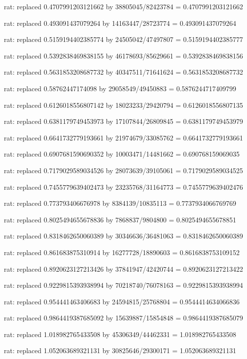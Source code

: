 \documentclass[a4paper,10pt]{article}
\begin{document}
\begin{eulernotebook}
\begin{eulercomment}
\begin{eulercomment}
\begin{eulercomment}
\begin{eulercomment}
\begin{eulercomment}
\begin{eulercomment}
\begin{eulercomment}
\begin{eulercomment}
\begin{eulercomment}
\begin{eulercomment}
\begin{eulercomment}
\begin{eulercomment}
\begin{eulercomment}
\begin{eulercomment}
\begin{eulercomment}
\begin{eulercomment}
\begin{euleroutput}
  rat: replaced 0.4707991203121662 by 38805045/82423784 = 0.4707991203121662
  
  rat: replaced 0.493091437079264 by 14163447/28723774 = 0.493091437079264
  
  rat: replaced 0.5159194402385774 by 24505042/47497807 = 0.5159194402385777
  
  rat: replaced 0.5392838469838155 by 46178693/85629661 = 0.5392838469838156
  
  rat: replaced 0.5631853208687732 by 40347511/71641624 = 0.5631853208687732
  
  rat: replaced 0.58762447174098 by 29058549/49450883 = 0.5876244717409799
  
  rat: replaced 0.6126018556807142 by 18023233/29420794 = 0.6126018556807135
  
  rat: replaced 0.6381179749453973 by 17107844/26809845 = 0.6381179749453979
  
  rat: replaced 0.6641732779193661 by 21974679/33085762 = 0.6641732779193661
  
  rat: replaced 0.6907681590690352 by 10003471/14481662 = 0.690768159069035
  
  rat: replaced 0.7179029589034526 by 28073639/39105061 = 0.7179029589034525
  
  rat: replaced 0.7455779639402473 by 23235768/31164773 = 0.7455779639402476
  
  rat: replaced 0.773793406676978 by 8384139/10835113 = 0.7737934066769769
  
  rat: replaced 0.8025494655678836 by 7868837/9804800 = 0.8025494655678851
  
  rat: replaced 0.8318462650060389 by 30346636/36481063 = 0.8318462650060389
  
  rat: replaced 0.861683875310914 by 16277728/18890603 = 0.8616838753109152
  
  rat: replaced 0.8920623127213426 by 37841947/42420744 = 0.8920623127213422
  
  rat: replaced 0.9229815393938994 by 70218740/76078163 = 0.9229815393938994
  
  rat: replaced 0.954441463406683 by 24594815/25768804 = 0.9544414634066836
  
  rat: replaced 0.9864419387685092 by 15639887/15854848 = 0.9864419387685079
  
  rat: replaced 1.018982765433508 by 45306349/44462331 = 1.018982765433508
  
  rat: replaced 1.052063689321131 by 30825646/29300171 = 1.052063689321131
  

\end{euleroutput}
\end{eulercomment}
\end{eulercomment}
\end{eulercomment}
\end{eulercomment}
\end{eulercomment}
\end{eulercomment}
\end{eulercomment}
\end{eulercomment}
\end{eulercomment}
\end{eulercomment}
\end{eulercomment}
\end{eulercomment}
\end{eulercomment}
\end{eulercomment}
\end{eulercomment}
\end{eulercomment}
\end{eulernotebook}
\end{document}
